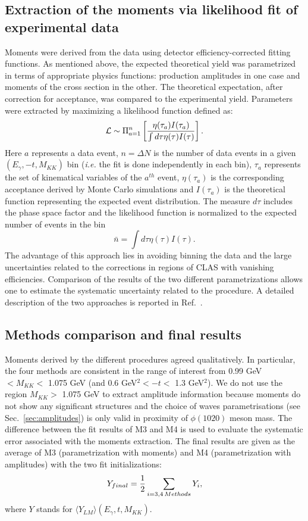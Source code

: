 \documentclass[twocolumn,superscriptaddress,prd]{revtex4}
\def\m{M}
\def\l{L}
\begin{document}
\subsection{Extraction of the moments via likelihood fit of experimental data}
Moments were derived from the data using detector efficiency-corrected fitting functions.
As mentioned above, the expected theoretical  yield was parametrized in terms of appropriate physics functions: production amplitudes
in one case and  moments of the cross section in the other. The theoretical expectation, after correction  for acceptance, 
was  compared to the experimental yield. 
Parameters were extracted by maximizing a likelihood function defined as:
\begin{equation}
{\cal L} \sim   \Pi_{a=1}^n  \left[ {\eta(\tau_a){I(\tau_a) } \over {\int d\tau \eta(\tau) I(\tau) }} \right]. 
\end{equation} 
Here  $a$ represents a data event, $n = \Delta N$ is the number of data events in a given $(E_\gamma,-t,M_{KK})$ bin ({\it i.e.}
the fit is done independently in each bin), $\tau_a$ represents  the set of kinematical variables of the $a^{th}$ event,
 $\eta(\tau_a)$ is the corresponding acceptance derived by Monte Carlo simulations  and $I(\tau_a)$ is the theoretical 
function representing the expected event distribution.
The measure $d\tau$ includes the phase space factor and the likelihood function is normalized to the expected number of events in the bin
\begin{equation} 
{\bar n} = \int d\tau \eta(\tau) I(\tau). 
\end{equation} 
The advantage of this approach lies in avoiding binning the data and the large uncertainties related to the corrections
in  regions of CLAS with vanishing efficiencies. Comparison of the results of the two different parametrizations 
allows one to estimate the systematic uncertainty related to the procedure.
A detailed description of the two approaches is reported in Ref.~\cite{2pi-clas}.


\subsection{Methods comparison and final results}\label{sec:final_moments}
Moments derived by the different procedures agreed qualitatively.
In particular, the four methods are consistent in the range of interest from 0.99 GeV $< M_{KK}<$ 1.075 GeV  (and 0.6 GeV$^2< -t < $ 1.3 GeV$^2$). We do not use the region $M_{KK}>$ 1.075 GeV 
to extract amplitude information because  moments do not show any significant structures and  the choice of waves parametrisations (see Sec.~\ref{sec:amplitudes}) is only valid in proximity of 
$\phi(1020)$ meson mass. 
The difference between  the fit results of M3 and M4 is used to evaluate the systematic error 
associated with the moments extraction. 
The final results are  given as the  average of 
M3 (parametrization with moments) and M4 (parametrization with amplitudes) with the two fit initializations:
\begin{equation}
Y_{final}={{1}\over{2}}\sum_{i=3,4 \, Methods}{Y_i},
\end{equation}
where $Y$ stands for  $\langle Y_{\l\m} \rangle(E_\gamma,t,M_{KK})$.
\end{document}
